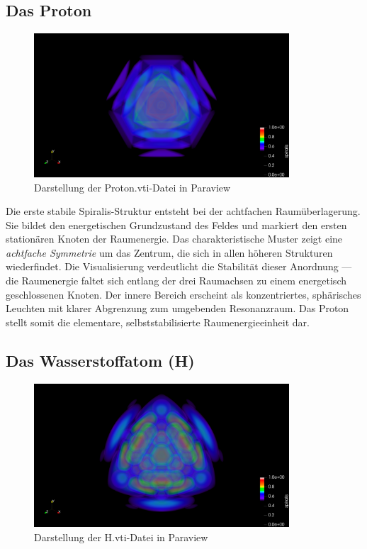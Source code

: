 \newpage

\subsection{Das Proton}

\begin{figure}
  \centering
  \includegraphics[width=0.85\textwidth]{Grafiken/05_Visualisierung/Proton/Proton_Volume_XYZ_Cam.jpeg}
  \caption{Darstellung der Proton.vti-Datei in Paraview}
  \label{fig:proton}
\end{figure}

Die erste stabile Spiralis-Struktur entsteht bei der achtfachen Raumüberlagerung. 
Sie bildet den energetischen Grundzustand des Feldes und markiert den ersten stationären Knoten der Raumenergie.
Das charakteristische Muster zeigt eine \emph{achtfache Symmetrie} um das Zentrum, die sich in allen höheren Strukturen wiederfindet. 
Die Visualisierung verdeutlicht die Stabilität dieser Anordnung — die Raumenergie faltet sich entlang der drei Raumachsen zu einem energetisch geschlossenen Knoten.
Der innere Bereich erscheint als konzentriertes, sphärisches Leuchten mit klarer Abgrenzung zum umgebenden Resonanzraum.
Das Proton stellt somit die elementare, selbststabilisierte Raumenergieeinheit dar.

\newpage

\subsection{Das Wasserstoffatom (H)}

\begin{figure}
  \centering
  \includegraphics[width=0.85\textwidth]{Grafiken/05_Visualisierung/H/H_Volume_XYZ_Cam.jpeg}
  \caption{Darstellung der H.vti-Datei in Paraview}
  \label{fig:H}
\end{figure}

